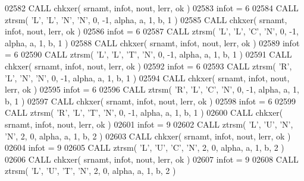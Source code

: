 \begin{DoxyCode}
02582       \textcolor{keyword}{CALL }chkxer( srnamt, infot, nout, lerr, ok )
02583       infot = 6
02584       \textcolor{keyword}{CALL }ztrsm( \textcolor{stringliteral}{'L'}, \textcolor{stringliteral}{'L'}, \textcolor{stringliteral}{'N'}, \textcolor{stringliteral}{'N'}, 0, -1, alpha, a, 1, b, 1 )
02585       \textcolor{keyword}{CALL }chkxer( srnamt, infot, nout, lerr, ok )
02586       infot = 6
02587       \textcolor{keyword}{CALL }ztrsm( \textcolor{stringliteral}{'L'}, \textcolor{stringliteral}{'L'}, \textcolor{stringliteral}{'C'}, \textcolor{stringliteral}{'N'}, 0, -1, alpha, a, 1, b, 1 )
02588       \textcolor{keyword}{CALL }chkxer( srnamt, infot, nout, lerr, ok )
02589       infot = 6
02590       \textcolor{keyword}{CALL }ztrsm( \textcolor{stringliteral}{'L'}, \textcolor{stringliteral}{'L'}, \textcolor{stringliteral}{'T'}, \textcolor{stringliteral}{'N'}, 0, -1, alpha, a, 1, b, 1 )
02591       \textcolor{keyword}{CALL }chkxer( srnamt, infot, nout, lerr, ok )
02592       infot = 6
02593       \textcolor{keyword}{CALL }ztrsm( \textcolor{stringliteral}{'R'}, \textcolor{stringliteral}{'L'}, \textcolor{stringliteral}{'N'}, \textcolor{stringliteral}{'N'}, 0, -1, alpha, a, 1, b, 1 )
02594       \textcolor{keyword}{CALL }chkxer( srnamt, infot, nout, lerr, ok )
02595       infot = 6
02596       \textcolor{keyword}{CALL }ztrsm( \textcolor{stringliteral}{'R'}, \textcolor{stringliteral}{'L'}, \textcolor{stringliteral}{'C'}, \textcolor{stringliteral}{'N'}, 0, -1, alpha, a, 1, b, 1 )
02597       \textcolor{keyword}{CALL }chkxer( srnamt, infot, nout, lerr, ok )
02598       infot = 6
02599       \textcolor{keyword}{CALL }ztrsm( \textcolor{stringliteral}{'R'}, \textcolor{stringliteral}{'L'}, \textcolor{stringliteral}{'T'}, \textcolor{stringliteral}{'N'}, 0, -1, alpha, a, 1, b, 1 )
02600       \textcolor{keyword}{CALL }chkxer( srnamt, infot, nout, lerr, ok )
02601       infot = 9
02602       \textcolor{keyword}{CALL }ztrsm( \textcolor{stringliteral}{'L'}, \textcolor{stringliteral}{'U'}, \textcolor{stringliteral}{'N'}, \textcolor{stringliteral}{'N'}, 2, 0, alpha, a, 1, b, 2 )
02603       \textcolor{keyword}{CALL }chkxer( srnamt, infot, nout, lerr, ok )
02604       infot = 9
02605       \textcolor{keyword}{CALL }ztrsm( \textcolor{stringliteral}{'L'}, \textcolor{stringliteral}{'U'}, \textcolor{stringliteral}{'C'}, \textcolor{stringliteral}{'N'}, 2, 0, alpha, a, 1, b, 2 )
02606       \textcolor{keyword}{CALL }chkxer( srnamt, infot, nout, lerr, ok )
02607       infot = 9
02608       \textcolor{keyword}{CALL }ztrsm( \textcolor{stringliteral}{'L'}, \textcolor{stringliteral}{'U'}, \textcolor{stringliteral}{'T'}, \textcolor{stringliteral}{'N'}, 2, 0, alpha, a, 1, b, 2 )

\end{DoxyCode}
